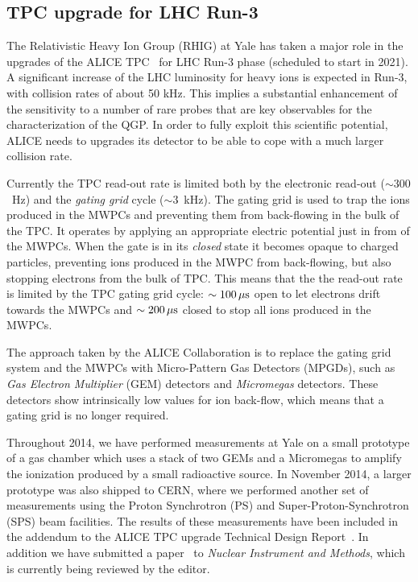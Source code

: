\documentclass[12pt, a4paper, twoside, titlepage]{article}
\begin{document}
\subsection{TPC upgrade for LHC Run-3}
The Relativistic Heavy Ion Group (RHIG) at Yale has taken a major role in the upgrades of the ALICE TPC~\cite{ALICE:2014c} for LHC Run-3 phase (scheduled to start in 2021).
A significant increase of the LHC luminosity for heavy ions is expected in Run-3, with collision rates of about 50 kHz. This implies a substantial enhancement
of the sensitivity to a number of rare probes that are key observables for the characterization of the QGP. In order to fully exploit this scientific potential, ALICE needs to
upgrades its detector to be able to cope with a much larger collision rate.

Currently the TPC read-out rate is limited both by the electronic read-out ($\sim 300$~Hz) and the \emph{gating grid} cycle ($\sim 3$~kHz).
The gating grid is used to trap the ions produced in the MWPCs and preventing them from back-flowing in the bulk of the TPC.
It operates by applying an appropriate electric potential just in from of the MWPCs. When the gate is in its \emph{closed} state
it becomes opaque to charged particles, preventing ions produced in the MWPC from back-flowing, but also stopping
electrons from the bulk of TPC. This means that the the read-out rate is limited by the TPC gating grid cycle: $\sim 100\, \rm \mu s$
open to let electrons drift towards the MWPCs and $\sim 200\, \rm \mu s$ closed to stop all ions produced in the MWPCs.

The approach taken by the ALICE Collaboration is to replace the gating grid system and the MWPCs with Micro-Pattern Gas Detectors (MPGDs),
such as \emph{Gas Electron Multiplier} (GEM) detectors and \emph{Micromegas} detectors. These detectors show intrinsically low values for ion back-flow,
which means that a gating grid is no longer required.

Throughout 2014, we have performed measurements at Yale on a small prototype of a gas chamber which uses a stack of two GEMs and a Micromegas to amplify the ionization
produced by a small radioactive source. In November 2014, a larger prototype was also shipped to CERN, where we performed another set of measurements using
the Proton Synchrotron (PS) and Super-Proton-Synchrotron (SPS) beam facilities.
The results of these measurements have been included in the addendum to the ALICE TPC upgrade Technical Design Report~\cite{ALICE:2015b}.
In addition we have submitted a paper~\cite{Aiola:2016a} to \emph{Nuclear Instrument and Methods}, which is currently being reviewed by the editor.
\end{document}
